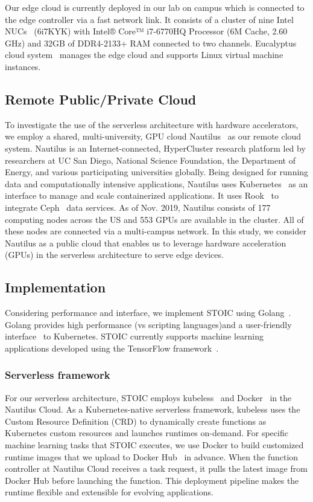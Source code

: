 Our edge cloud is currently deployed in our lab on campus which is connected to the edge controller via a fast network link. It consists of a cluster of nine Intel NUCs~\cite{ref:nucs} (6i7KYK) with Intel® Core™ i7-6770HQ Processor (6M Cache, 2.60 GHz) and 32GB of DDR4-2133+ RAM connected to two channels. Eucalyptus cloud system~\cite{ref:euca} manages the edge cloud and supports Linux virtual machine instances. 
 
 \subsection{Remote Public/Private Cloud}

To investigate the use of the serverless architecture with hardware accelerators, we employ a shared, multi-university, GPU cloud Nautilus~\cite{ref:nautilus} as our remote cloud system. Nautilus is an Internet-connected, HyperCluster research platform led by researchers at UC San Diego, National Science Foundation, the Department of Energy, and various participating universities globally.  Being designed for running data and computationally intensive applications, Nautilus uses Kubernetes~\cite{ref:k8s} as an interface to manage and scale containerized applications.  It uses Rook~\cite{ref:rook} to integrate Ceph~\cite{ref:ceph} data services. As of Nov. 2019, Nautilus consists of 177 computing nodes across the US and 553 GPUs are available in the cluster. All of these nodes are connected via a multi-campus network. In this study, we consider Nautilus as a public cloud that enables us to leverage hardware acceleration (GPUs) in the serverless architecture to serve edge devices. 
 
 \subsection{Implementation}
 
 Considering performance and interface, we
implement STOIC using Golang~\cite{ref:golang}. Golang provides high 
performance (vs scripting languages)and a user-friendly 
interface~\cite{ref:client-go} to Kubernetes.  STOIC currently supports
machine learning applications developed using the TensorFlow 
framework~\cite{ref:tensorflow}.
 
 \BlankLine
 \subsubsection{Serverless framework}
 For our serverless architecture, STOIC employs 
kubeless~\cite{ref:kubeless} and Docker~\cite{ref:docker} in the
 Nautilus Cloud. As a Kubernetes-native serverless framework, 
kubeless uses the Custom Resource Definition (CRD)\cite{ref:crd} to dynamically create functions as Kubernetes custom resources and launches runtimes on-demand. For specific machine learning tasks that STOIC executes, we use Docker to build customized runtime images that we upload to Docker 
Hub~\cite{ref:dockerhub} in advance. When the function controller 
at Nautilus Cloud receives a task request, it pulls the latest image 
from Docker Hub before launching the function. This deployment pipeline 
makes the runtime flexible and extensible for evolving applications. 
 
